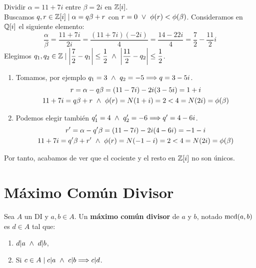 \begin{ejemplo}
    Dividir $\alpha=11+7i$ entre $\beta=2i$ en $\mathbb Z[i]$.\\
    
    Buscamos $q,r \in \mathbb Z[i] \mid \alpha = q\beta +r$ con $r=0 \ \lor \  \phi(r) < \phi(\beta)$. Consideramos en $\mathbb Q[i]$ el siguiente elemento:
    $$\dfrac{\alpha}{\beta} = \dfrac{11+7i}{2i} = \dfrac{(11+7i)(-2i)}{4} = \dfrac{14-22i}{4} = \dfrac{7}{2} - \dfrac{11}{2}i$$
    Elegimos $q_1, q_2 \in \mathbb Z \mid \left|\dfrac{7}{2}-q_1\right|\leq \dfrac{1}{2} \ \land \  \left|\dfrac{11}{2}-q_2\right|\leq \dfrac{1}{2}$.
    \begin{enumerate}
        \item Tomamos, por ejemplo $q_1=3 \ \land \  q_2 = -5 \Longrightarrow q=3-5i$.
        \begin{gather*}
            r=\alpha-q\beta = (11-7i)-2i(3-5i) = 1+i \\
            11+7i = q\beta + r \ \land \  \phi(r) = N(1+i) = 2 < 4 = N(2i) = \phi(\beta)
        \end{gather*}

        \item Podemos elegir también $q_1'=4 \ \land \  q_2'=-6 \Longrightarrow q' = 4-6i$.
        \begin{gather*}
            r'=\alpha-q'\beta = (11-7i)-2i(4-6i) = -1-i \\
            11+7i = q'\beta + r' \ \land \  \phi(r) = N(-1-i) = 2 < 4 = N(2i) = \phi(\beta)
        \end{gather*}
    \end{enumerate}

    Por tanto, acabamos de ver que el cociente y el resto en $\mathbb Z[i]$ no son únicos.
\end{ejemplo}



\section{Máximo Común Divisor}
\begin{definicion}
    Sea $A$ un DI y $a,b \in A$. Un \textbf{máximo común divisor} de $a$ y $b$, notado $\operatorname{mcd}(a,b)$ es $d \in A$ tal que:
    \begin{enumerate}
        \item $d|a \ \land \  d|b$,
        \item Si $c\in A \mid c|a \ \land \  c|b \Longrightarrow c|d$.
    \end{enumerate}
\end{definicion}

